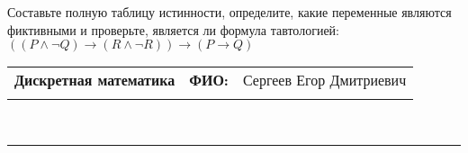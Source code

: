 \documentclass[10pt]{exam}
\newcommand{\class}{Дискретная математика}
\newcommand{\examdate}{}
\begin{document}
\begin{questions}
\begin{enumerate}[a)]
\end{enumerate}\question Составьте полную таблицу истинности, определите, какие переменные являются фиктивными и проверьте, является ли формула тавтологией:
$(( P \land \neg Q) \rightarrow (R \land \neg R)) \rightarrow (P \rightarrow Q)$

\end{questions}
\newpage
\begin{flushright}
\begin{tabular}{p{2.8in} r l}
\textbf{\class} & \textbf{ФИО:} &Сергеев Егор Дмитриевич
\\

\textbf{\examdate} &&\\
\end{tabular}\\
\end{flushright}
\rule[1ex]{\textwidth}{.1pt}
\end{document}
